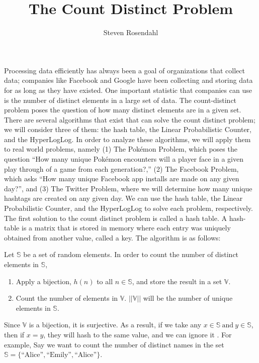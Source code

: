\documentclass{article}
\title{The Count Distinct Problem}
\author{Steven Rosendahl}
\date{}
\begin{document}
\maketitle
\indent Processing data efficiently has always been a goal of organizations that collect data; companies like Facebook and Google have been collecting and storing data for as long as they have existed.
One important statistic that companies can use is the number of distinct elements in a large set of data.
The count-distinct problem poses the question of how many distinct elements are in a given set. 
There are several algorithms that exist that can solve the count distinct problem; we will consider three of them:
the hash table, the Linear Probabilistic Counter, and the HyperLogLog. 
In order to analyze these algorithms, we will apply them to real world problems, namely (1) The Pok\'emon Problem, which poses the question ``How many unique Pok\'emon encounters will a player face in a given play through of a game from each generation?,'' (2) The Facebook Problem, which asks ``How many unique Facebook app installs are made on any given day?'', and (3) The Twitter Problem, where we will determine how many unique hashtags are created on any given day. 
We can use the hash table, the Linear Probabilistic Counter, and the HyperLogLog to solve each problem, respectively.\\
\indent The first solution to the count distinct problem is called a hash table. 
A hash-table is a matrix that is stored in memory where each entry was uniquely obtained from another value, called a key. 
The algorithm is as follows:
\begin{center}
Let $\mathbb{S}$ be a set of random elements. In order to count the number of distinct elements in $\mathbb{S}$,
\begin{enumerate}
\item Apply a bijection, $h(n)$ to all $n\in\mathbb{S}$, and store the result in a set $\mathbb{V}$.
\item Count the number of elements in $\mathbb{V}$. $||\mathbb{V}||$ will be the number of unique elements in $\mathbb{S}$.
\end{enumerate}
\end{center}
Since $\mathbb{V}$ is a bijection, it is surjective. 
As a result, if we take any $x\in\mathbb{S}\ \text{and}\ y\in\mathbb{S}$, then if $x = y$, they will hash to the same value, and we can ignore it \cite[p. 6]{Maurer}. 
For example, Say we want to count the number of distinct names in the set $\mathbb{S} = \{\text{``Alice''},\text{``Emily''},\text{``Alice''}\}$. 
\end{document}
